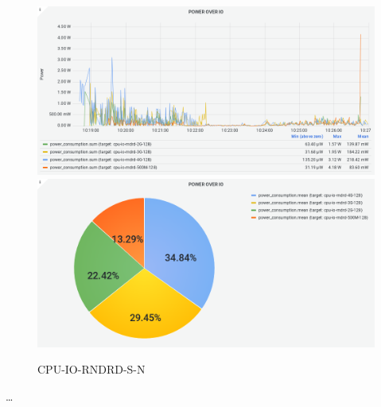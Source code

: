 \documentclass[a4paper, 11pt]{article}
\begin{document}
\begin{figure}[h]
\caption{CPU-IO-RNDRD-S-N}
\centering
\includegraphics[scale=0.4]{image33}
\includegraphics[scale=0.4]{image36}
\end{figure}
\ldots

\pagebreak
\listoffigures

\clearpage
\nocite{*}
\printbibliography
\end{document}
